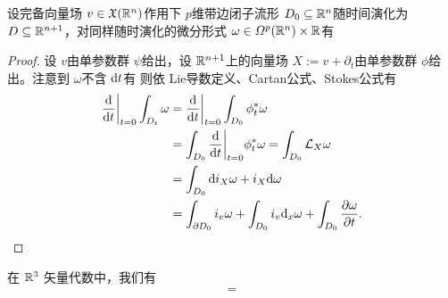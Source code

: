 \begin{theorem}
    设完备向量场 $v\in\mathfrak X(\mathbb{R}^n)$作用下 $p$维带边闭子流形 $D_0\subseteq\mathbb{R}^n$随时间演化为 $D\subseteq\mathbb{R}^{n+1}$，对同样随时演化的微分形式 $\omega\in\Omega^p(\mathbb{R}^n)\times\mathbb{R}$有 
\end{theorem}
\begin{proof}
    设 $v$由单参数群 $\psi$给出，设 $\mathbb{R}^{n+1}$上的向量场 $X:=v+\partial_t$由单参数群 $\phi$给出。注意到 $\omega$不含 $\dd t$有
    则依 Lie导数定义、Cartan公式、Stokes公式有
    \begin{align*} \dv{t}\bigg|_{t=0}\int_{D_t}\omega&=\dv{t}\bigg|_{t=0}\int_{D_0}\phi_t^*\omega\\ &=\int_{D_0}\dv{t}\bigg|_{t=0}\phi_t^*\omega=\int_{D_0}\mathcal L_X\omega\\ &=\int_{D_0}\dd i_X\omega+i_X\dd\omega\\ &=\int_{\partial D_0}i_v\omega+\int_{D_0}i_v\dd_x\omega+\int_{D_0}\frac{\partial\omega}{\partial t}.\qedhere \end{align*}
\end{proof}

\begin{eg}
    在 $\mathbb{R}^3$ 矢量代数中，我们有
    \begin{align*}
        =
    \end{align*}
\end{eg}
